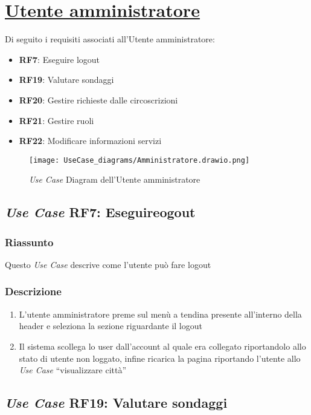 \section{\underline{Utente amministratore}}
    Di seguito i requisiti associati all'Utente amministratore:
    \begin{itemize}
        \item \textbf{RF7}: Eseguire logout
        \item \textbf{RF19}: Valutare sondaggi
        \item \textbf{RF20}: Gestire richieste dalle circoscrizioni
        \item \textbf{RF21}: Gestire ruoli
        \item \textbf{RF22}: Modificare informazioni servizi
    \end{itemize}
    \begin{figure}[H]
        \centering
        \texttt{[image: UseCase\_diagrams/Amministratore.drawio.png]}
        \caption{\textit{Use Case} Diagram dell'Utente amministratore}
    \end{figure}

    \subsection{\textit{Use Case} RF7: Eseguireogout}
        \subsubsection{Riassunto}
            Questo \textit{Use Case} descrive come l'utente può fare logout
        \subsubsection{Descrizione}
            \begin{enumerate}
                \item L'utente amministratore preme sul menù a tendina presente all'interno della header e seleziona la sezione riguardante il logout
                \item Il sistema scollega lo user dall'account al quale era collegato riportandolo allo stato di utente non loggato, infine 
                ricarica la pagina riportando l'utente allo \textit{Use Case} ``visualizzare città''
            \end{enumerate}

    \subsection{\textit{Use Case} RF19: Valutare sondaggi}

